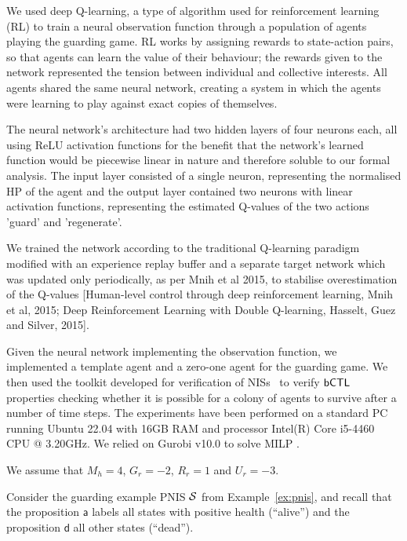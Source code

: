 We used deep Q-learning, a type of algorithm used for reinforcement learning (RL) to train a neural observation function through a population of agents playing the guarding game. RL works by assigning rewards to state-action pairs, so that agents can learn the value of their behaviour; the rewards given to the network represented the tension between individual and collective interests. All agents shared the same neural network, creating a system in which the agents were learning to play against exact copies of themselves. 

The neural network's architecture had two hidden layers of four neurons each, all using ReLU activation functions for the benefit that the network's learned function would be piecewise linear in nature and therefore soluble to our formal analysis. The input layer consisted of a single neuron, representing the normalised HP of the agent and the output layer contained two neurons with linear activation functions, representing the estimated Q-values of the two actions 'guard' and 'regenerate'. 

We trained the network according to the traditional Q-learning paradigm modified with an experience replay buffer and a separate target network which was updated only periodically, as per Mnih et al 2015, to stabilise overestimation of the Q-values [Human-level control through deep reinforcement learning, Mnih et al, 2015; Deep Reinforcement Learning with Double Q-learning, Hasselt, Guez and Silver, 2015]. 



Given the neural network implementing the observation function, we 
implemented a template agent and a zero-one agent for the guarding game. We
then used the \venmas toolkit developed for verification of
NISs~\cite{Akintunde+20b} to verify $\sf{bCTL}$ properties checking whether it is
possible for a colony of agents to survive after a number of time steps.
%
The experiments have been performed on a standard PC running Ubuntu 22.04 with
16GB RAM and processor Intel(R) Core i5-4460 CPU @ 3.20GHz. We relied on Gurobi
v10.0 to solve MILP \cite{Gurobi+16a}.

We assume that $M_h = 4$, $G_r = -2$, $R_r = 1$ and $U_r = -3$. 

Consider the guarding example PNIS $\mathcal S$ from Example~\ref{ex:pnis}, and recall that the proposition $\mathsf{a}$ labels all states with positive health (``alive'') and the proposition $\mathsf{d}$ all other states (``dead'').

